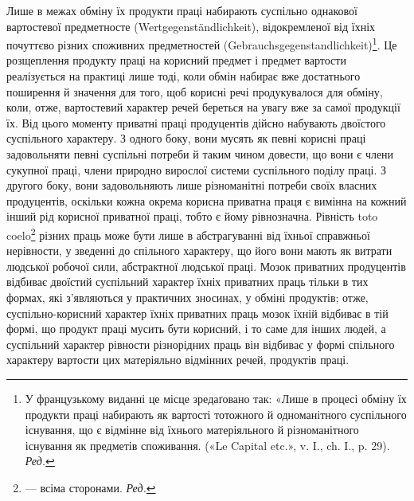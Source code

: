 Лише в межах обміну їх продукти праці набирають суспільно
однакової вартостевої предметносте (Wertgegenständlichkeit), відокремленої
від їхніх почуттєво різних споживних предметностей
(Gebrauchsgegenstandlichkeit)\footnote*{
У французькому виданні це місце зредаґовано так: «Лише в процесі
обміну їх продукти праці набирають як вартості тотожного й одноманітного
суспільного існування, що є відмінне від їхнього матеріяльного
й різноманітного існування як предметів споживання. («Le Capital
etc.», v. I., ch. I., p. 29). \emph{Ред.}
}. Це розщеплення продукту праці
на корисний предмет і предмет вартости реалізується на практиці
лише тоді, коли обмін набирає вже достатнього поширення й значення
для того, щоб корисні речі продукувалося для обміну, коли,
отже, вартостевий характер речей береться на увагу вже за самої
продукції їх. Від цього моменту приватні праці продуцентів
дійсно набувають двоїстого суспільного характеру. З одного боку,
вони мусять як певні корисні праці задовольняти певні суспільні
потреби й таким чином довести, що вони є члени сукупної праці,
члени природно вирослої системи суспільного поділу праці. З другого
боку, вони задовольняють лише різноманітні потреби своїх
власних продуцентів, оскільки кожна окрема корисна приватна
праця є вимінна на кожний інший рід корисної приватної праці,
тобто є йому рівнозначна. Рівність toto coelo\footnote*{
— всіма сторонами. \emph{Ред.}
} різних праць може
бути лише в абстрагуванні від їхньої справжньої нерівности, у
зведенні до спільного характеру, що його вони мають як витрати
людської робочої сили, абстрактної людської праці. Мозок приватних
продуцентів відбиває двоїстий суспільний характер їхніх
приватних праць тільки в тих формах, які з’являються у практичних
зносинах, у обміні продуктів; отже, суспільно-корисний
характер їхніх приватних праць мозок їхній відбиває в тій формі,
що продукт праці мусить бути корисний, і то саме для інших
людей, а суспільний характер рівности різнорідних праць він
відбиває у формі спільного характеру вартости цих матеріяльно
відмінних речей, продуктів праці.

